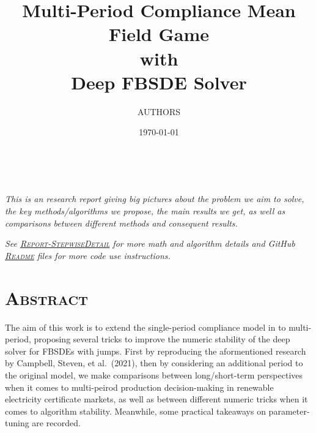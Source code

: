 \documentclass[a4paper,10pt]{article}
\newcommand{\1}{\mathbf{1}}
\begin{document}
\pagestyle{fancy}
\fancyhf{}

\title{
    \textbf{\huge
        Multi-Period Compliance Mean Field Game \\
        with \\
        Deep FBSDE Solver}}

\Large\selectfont
\medskip
\author{AUTHORS}
\date{\today}
\maketitle

\\\hline

\vspace{30pt}

\large
\textit{
This is an research report giving big pictures about the problem we aim
to solve, the key methods/algorithms we propose, the main results we
get, as well as comparisons between different methods and consequent
results.
}

\vspace{20pt}

\textit{
See \href{https://github.com/OrangeAoo/PA-MFG-FBSDE/blob/f95ab0c9c54fb68cb3517f975ac3aa2fb8b3d429/FinalReports/Report-StepwiseDetail.md}{\textsc{Report-StepwiseDetail}} for more math and algorithm details and GitHub \href{https://github.com/OrangeAoo/PA-MFG-FBSDE/blob/3cffc5e8dbe09fbc880f6c2c70d76e0b6a1b8c3c/2Period/Joint_Optim_2Prdx1/README.md}{\textsc{Readme}} files for more code use instructions.
}

\vfill
\newpage  %

\setlength{\parindent}{0pt}

\section*{\textsc{Abstract}}

\normalsize The aim of this work is to extend the single-period compliance model in \cite{SC} to
multi-period, proposing several tricks to improve the numeric stability of the deep solver for FBSDEs with jumps. First by reproducing the aformentioned research by Campbell, Steven, et al.~(2021), then by considering an additional period to the original model, we make comparisons between long/short-term perspectives when it comes to multi-peirod production decision-making in renewable electricity certificate markets, as well as between different numeric tricks when it comes to algorithm stability. Meanwhile, some practical takeaways on parameter-tuning are recorded.
\end{document}
